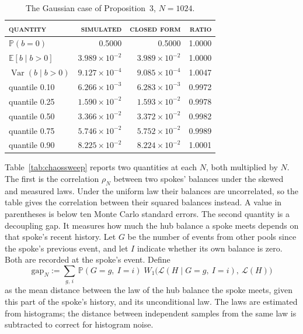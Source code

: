 \documentclass[11pt,a4paper]{article}
\DeclareRobustCommand{\thd}[1]{{\scshape\addfontfeatures{LetterSpace=1.5}\MakeLowercase{#1}}}
\theoremstyle{siphon}
\begin{document}
\begin{table}[!htb]
\centering
\caption{The Gaussian case of Proposition~3, $N = 1024$.}
\label{tab:halfnormal_sim}
\begin{tabular}{@{}lrrr@{}}
\toprule
\thd{Quantity} & \thd{Simulated} & \thd{Closed form} & \thd{Ratio}  \\
\midrule
$\mathbb{P}(b = 0)$ & 0.5000 & 0.5000 & 1.0000 \\
$\mathbb{E}[b \mid b > 0]$ & $3.989 \times 10^{-2}$ & $3.989 \times 10^{-2}$ & 1.0000 \\
$\operatorname{Var}(b \mid b > 0)$ & $9.127 \times 10^{-4}$ & $9.085 \times 10^{-4}$ & 1.0047 \\
quantile 0.10 & $6.266 \times 10^{-3}$ & $6.283 \times 10^{-3}$ & 0.9972 \\
quantile 0.25 & $1.590 \times 10^{-2}$ & $1.593 \times 10^{-2}$ & 0.9978 \\
quantile 0.50 & $3.366 \times 10^{-2}$ & $3.372 \times 10^{-2}$ & 0.9982 \\
quantile 0.75 & $5.746 \times 10^{-2}$ & $5.752 \times 10^{-2}$ & 0.9989 \\
quantile 0.90 & $8.225 \times 10^{-2}$ & $8.224 \times 10^{-2}$ & 1.0001 \\
\bottomrule
\end{tabular}
\end{table}

Table~\ref{tab:chaossweep} reports two quantities at each $N$, both multiplied by $N$. The first is the correlation $\rho_N$ between two spokes' balances under the skewed and measured laws. Under the uniform law their balances are uncorrelated, so the table gives the correlation between their squared balances instead. A value in parentheses is below ten Monte Carlo standard errors. The second quantity is a decoupling gap. It measures how much the hub balance a spoke meets depends on that spoke's recent history. Let $G$ be the number of events from other pools since the spoke's previous event, and let $I$ indicate whether its own balance is zero. Both are recorded at the spoke's event. Define
\begin{equation}\label{eq:etaN}
\mathrm{gap}_N  :=  \sum_{g,\,i}\,\mathbb{P}(G = g,\ I = i)\;W_1\bigl(\mathcal{L}(H \mid G = g,\ I = i),\ \mathcal{L}(H)\bigr)
\end{equation}
as the mean distance between the law of the hub balance the spoke meets, given this part of the spoke's history, and its unconditional law. The laws are estimated from histograms; the distance between independent samples from the same law is subtracted to correct for histogram noise.
\end{document}
